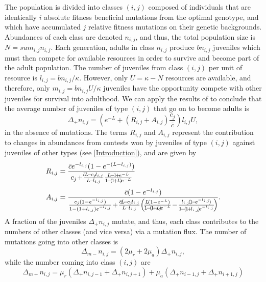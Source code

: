 \documentclass[9pt,twocolumn,twoside]{article}
\begin{document}
The population is divided into classes $(i,j)$ composed of individuals that are identically $i$ absolute fitness beneficial mutations from the optimal genotype, and which have accumulated $j$ relative fitness mutations on their genetic backgrounds. Abundances of each class are denoted $n_{i,j}$, and thus, the total population size is $N=sum_{i,j} n_{i,j}$. Each generation, adults in class $n_{i,j}$ produce $b n_{i,j}$ juveniles which must then compete for available resources in order to survive and become part of the adult population. The number of juveniles from class $(i,j)$ per unit of resource is $l_{i,j} = b n_{i,j}/\kappa$. However, only $U=\kappa-N$ resources are available, and therefore, only $m_{i,j} = b n_{i,j} U/\kappa$ juveniles have the opportunity compete with other juveniles for survival into adulthood. We can apply the results of \citet{Bertram2019} to conclude that the average number of juveniles of type $(i,j)$ that go on to become adults is
\begin{equation}\label{eq:BMlotNewAd}
    \Delta_{+}n_{i,j} = (e^{-L} +(R_{i,j}+A_{i,j})\frac{c_j}{\bar{c}})l_{i,j} U, 
\end{equation}
in the absence of mutations. The terms $R_{i,j}$ and $A_{i,j}$ represent the contribution to changes in abundances from contests won by juveniles of type $(i,j)$ against juveniles of other types (see \ref{Introduction}), and are given by
\[
\begin{aligned}
R_{i,j} &= \frac{\bar{c}e^{-l_{i,j}}(1-e^{-(L-l_{i,j})})}{c_j\! +\!\frac{\!\bar{c}\!L\!-\!c_j\!l_{i,j}}{L\!-\!l_{i,j}}\frac{L\!-\!1\!+\!e^{-L}}{1\!-\!(\!1\!+\!L\!)\!e^{-L}}}\\[3pt]
A_{i,j} &= \frac{\bar{c}(1-e^{-l_{i,j}})}{ \footnotesize \frac{c_j(1-e^{-l_{i,j}})}{1-(1+l_{i,j})e^{-l_{i,j}}}\!+\!\frac{\bar{c}\!L\!-\!c_j\!l_{i,j}}{L\!-\!l_{i,j}}\!\left(\!\frac{L\!(1-e^{-L})}{1\!-\!(\!1\!+\!L\!)\!e^{-L}}\!-\!\frac{l_{i,j}\!(\!1\!-\!e^{-l_{i,j}}\!)}{1\!-\!(\!1\!+\!l_{i,j}\!)\!e^{-l_{i,j}}}\!\right)}.\\
\end{aligned}
\]
A fraction of the juveniles $\Delta_+ n_{i,j}$ mutate, and thus, each class contributes to the numbers of other classes (and vice versa) via a mutation flux. The number of mutations going into other classes is 
\[
\Delta_{m-} n_{i,j} = (2\mu_r+2\mu_a)\Delta_+ n_{i,j},
\]
while the number coming into class $(i,j)$ are 
\[
\Delta_{m+} n_{i,j} = \mu_r(\Delta_+ n_{i,j-1}+\Delta_+ n_{i,j+1})+\mu_a(\Delta_+ n_{i-1,j}+\Delta_+ n_{i+1,j})
\]
\end{document}
